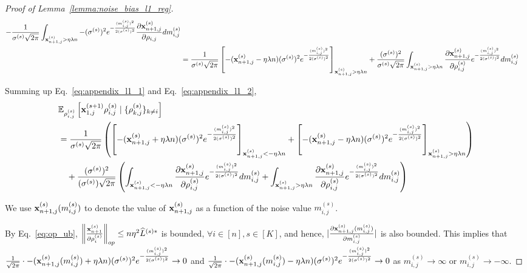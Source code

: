 \begin{proof}[Proof of Lemma~\ref{lemma:noise_bias_l1_reg}]
\begin{align}
    - \frac{1}{\sigma^{(s)} \sqrt{2\pi}}
    \int_{{\mathbf{x}}_{n+1,j}^{(s)} > \eta \lambda n}
    - (\sigma^{(s)})^2 e^{-\frac{(m_{i,j}^{(s)})^2}{2 (\sigma^{(s)})^2}} \frac{\partial {\mathbf{x}}_{n+1,j}^{(s)}}{\partial \rho_{i, j}} dm_{i,j}^{(s)}\\
\label{eq:appendix_l1_2}
    &= \frac{1}{\sigma^{(s)} \sqrt{2\pi}}\left[
    - ({\mathbf{x}}_{n+1,j}^{(s)} - \eta \lambda n) (\sigma^{(s)})^2 e^{-\frac{(m_{i,j}^{(s)})^2}{2 (\sigma^{(s)})^2}}
    \right]_{{\mathbf{x}}_{n+1,j}^{(s)} > \eta \lambda n}
    + \frac{(\sigma^{(s)})^2}{\sigma^{(s)} \sqrt{2\pi}}
    \int_{{\mathbf{x}}_{n+1,j}^{(s)} > \eta \lambda n} \frac{\partial {\mathbf{x}}_{n+1,j}^{(s)}}{\partial \rho_{i, j}^{(s)}}
    e^{-\frac{(m_{i,j}^{(s)})^2}{2 (\sigma^{(s)})^2}} d m_{i,j}^{(s)}
\end{align}

Summing up Eq.~\ref{eq:appendix_l1_1} and Eq.~\ref{eq:appendix_l1_2},
\begin{align}
\label{eq:l1_reg_exp_single_coord}
    &\mathbb{E}_{\rho_{i,j}^{(s)}}\left[ {\mathbf{x}}_{1,j}^{(s+1)} \rho_{i, j}^{(s)} \mid \{\rho_{k,j}^{(s)}\}_{k\neq i} \right]\\
    \nonumber
    &= \frac{1}{\sigma^{(s)} \sqrt{2\pi}} \left( \left[ -({\mathbf{x}}_{n+1,j}^{(s)} + \eta \lambda n) (\sigma^{(s)})^2 e^{-\frac{(m_{i,j}^{(s)})^2}{2 (\sigma^{(s)})^2}}  \right]_{{\mathbf{x}}_{n+1,j}^{(s)} < - \eta \lambda n} + \left[ -({\mathbf{x}}_{n+1,j}^{(s)} - \eta \lambda n) (\sigma^{(s)})^2 e^{-\frac{(m_{i,j}^{(s)})^2}{2 (\sigma^{(s)})^2}} \right]_{{\mathbf{x}}_{n+1,j}^{(s)} > \eta \lambda n}\right) \\
    \nonumber
    &\quad + \frac{ (\sigma^{(s)})^2}{ (\sigma^{(s)}) \sqrt{2\pi}}\left(
    \int_{{\mathbf{x}}_{n+1,j}^{(s)} < - \eta \lambda n} \frac{\partial {\mathbf{x}}_{n+1,j}^{(s)}}{\partial \rho_{i, j}^{(s)} } e^{-\frac{(m_{i,j}^{(s)})^2}{2 (\sigma^{(s)})^2}}dm_{i,j}^{(s)}
    + \int_{{\mathbf{x}}_{n+1,j}^{(s)} > \eta \lambda n} \frac{\partial {\mathbf{x}}_{n+1,j}^{(s)}}{\partial \rho_{i, j}^{(s)} } e^{-\frac{(m_{i,j}^{(s)})^2}{2 (\sigma^{(s)})^2}} dm_{i,j}^{(s)}
    \right)
\end{align}


We use ${\mathbf{x}}_{n+1,j}^{(s)}(m_{i,j}^{(s)})$ to denote the value of ${\mathbf{x}}_{n+1,j}^{(s)}$ as a function of the noise value $m_{i,j}^{(s)}$.

By Eq.~\ref{eq:op_ub}, $\left\| \frac{{\mathbf{x}}_{n+1}^{(s)}}{\partial \rho_i^{(s)}} \right\|_{op} \leq n \eta^2 \widehat{L}^{(s)*}$ is bounded, $\forall i\in [n], s\in [K]$, and hence, $|\frac{\partial {\mathbf{x}}_{n+1,j}^{(s)}(m_{i,j}^{(s)})}{\partial m_{i,j}^{(s)}}|$ is also bounded.
This implies that $\frac{1}{\sqrt{2\pi}} \cdot -({\mathbf{x}}_{n+1,j}^{(s)}(m_{i,j}^{(s)}) + \eta \lambda n) (\sigma^{(s)})^2 e^{-\frac{(m_{i,j}^{(s)})^2}{2 (\sigma^{(s)})^2}}\rightarrow 0$ 
and $\frac{1}{\sqrt{2\pi}}\cdot -({\mathbf{x}}_{n+1,j}^{(s)}(m_{i,j}^{(s)}) - \eta \lambda n) (\sigma^{(s)})^2 e^{-\frac{(m_{i,j}^{(s)})^2}{2(\sigma^{(s)})^2}} \rightarrow 0$
as $m_{i,j}^{(s)} \rightarrow \infty$ or $m_{i,j}^{(s)} \rightarrow -\infty$. 


\end{proof}
